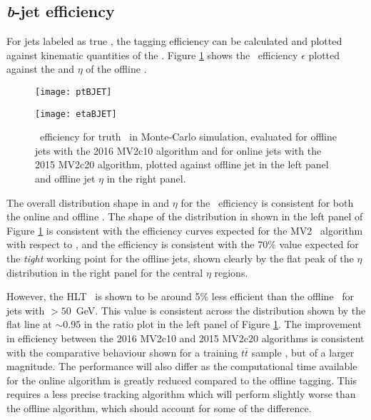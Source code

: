 	\subsection{\textit{b}-jet efficiency}
	\label{obp:beff}

	For jets labeled as true \bjets, the tagging efficiency can be calculated and plotted against kinematic quantities of the \bjets. Figure \ref{fig:MC:bjetefficiency} shows the \btag\ efficiency $\epsilon$ plotted against the \pt and $\eta$ of the offline \bjet.

		\begin{figure}[h]
			\centering
			\begin{minipage}[h]{0.48\linewidth}
				\texttt{[image: ptBJET]}

			\end{minipage}
			\quad
			\begin{minipage}[h]{0.48\linewidth}
				\texttt{[image: etaBJET]}
			\end{minipage}
			\caption[Comparison of \bjet\ tagging efficiency on truth \bjets\ between online and offline jets in Monte-Carlo simulation]{\btag\, efficiency for truth \bjets\, in Monte-Carlo simulation, evaluated for offline jets with the 2016 MV2c10 algorithm and for online jets with the 2015 MV2c20 algorithm, plotted against offline jet \pt in the left panel and offline jet $\eta$ in the right panel.}
			\label{fig:MC:bjetefficiency}
		\end{figure}

		The overall distribution shape in \pt and $\eta$ for the \btag\ efficiency is consistent for both the online and offline \bjet. The shape of the distribution in \pt shown in the left panel of Figure \ref{fig:MC:bjetefficiency} is consistent with the efficiency curves expected for the MV2 \btag\ algorithm with respect to \pt \cite{btagOptimisation}, and the efficiency is consistent with the $70\%$ value expected for the \textit{tight} working point for the offline jets, shown clearly by the flat peak of the $\eta$ distribution in the right panel for the central $\eta$ regions.

		However, the HLT \btag\ is shown to be around 5\% less efficient than the offline \btag\ for jets with \pt$>50$~GeV. This value is consistent across the \pt distribution shown by the flat line at $\sim0.95$ in the ratio plot in the left panel of Figure \ref{fig:MC:bjetefficiency}. The improvement in efficiency between the 2016 MV2c10 and 2015 MV2c20 algorithms is consistent with the comparative behaviour shown for a training $t\bar{t}$ sample \cite{btagOptimisation}, but of a larger magnitude. The performance will also differ as the computational time available for the online algorithm is greatly reduced compared to the offline tagging. This requires a less precise tracking algorithm which will perform slightly worse than the offline algorithm, which should account for some of the difference.

